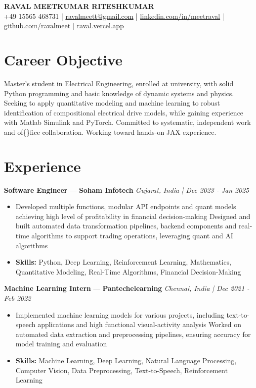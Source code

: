 \documentclass[a4paper,10pt]{article}
\begin{document}
\begin{center}
  {\Large\bfseries RAVAL MEETKUMAR RITESHKUMAR}\\[2pt]
  {\small +49 15565 468731 \;|\; \href{mailto:ravalmeett@gmail.com}{ravalmeett@gmail.com} \;|\; \href{https://www.linkedin.com/in/meetraval/}{linkedin.com/in/meetraval} \;|\; \href{https://github.com/ravalmeet}{github.com/ravalmeet} \;|\; \href{https://raval.vercel.app/}{raval.vercel.app}}
\end{center}
\vspace{-3pt}

\section*{Career Objective}
Master's student in Electrical Engineering, enrolled at university, with solid Python programming and basic knowledge of dynamic systems and physics. Seeking to apply quantitative modeling and machine learning to robust identification of compositional electrical drive models, while gaining experience with Matlab Simulink and PyTorch. Committed to systematic, independent work and of\{\}fice collaboration. Working toward hands-on JAX experience.\par

\section*{Experience}
\textbf{Software Engineer} — \textbf{Soham Infotech} \hfill \textit{Gujarat, India \;|\; Dec 2023 - Jan 2025}\par
\vspace{1pt}
\begin{itemize}
  \item Developed multiple functions, modular API endpoints and quant models achieving high level of profitability in financial decision-making Designed and built automated data transformation pipelines, backend components and real-time algorithms to support trading operations, leveraging quant and AI algorithms
  \item \textbf{Skills:} Python, Deep Learning, Reinforcement Learning, Mathematics, Quantitative Modeling, Real-Time Algorithms, Financial Decision-Making
\end{itemize}
\vspace{3pt}
\textbf{Machine Learning Intern} — \textbf{Pantechelearning} \hfill \textit{Chennai, India \;|\; Dec 2021 - Feb 2022}\par
\vspace{1pt}
\begin{itemize}
  \item Implemented machine learning models for various projects, including text-to-speech applications and high functional visual-activity analysis Worked on automated data extraction and preprocessing pipelines, ensuring accuracy for model training and evaluation
  \item \textbf{Skills:} Machine Learning, Deep Learning, Natural Language Processing, Computer Vision, Data Preprocessing, Text-to-Speech, Reinforcement Learning
\end{itemize}
\end{document}
